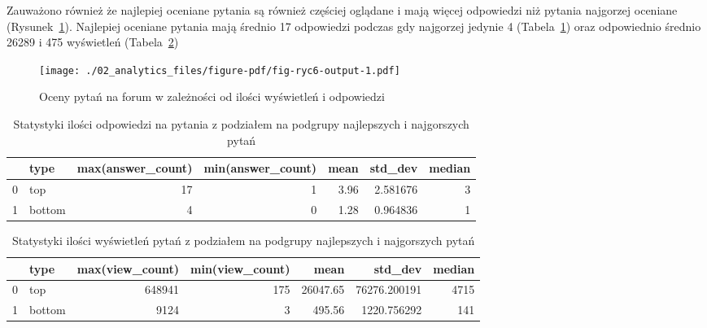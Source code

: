 \documentclass[
  letterpaper,
  DIV=11,
  numbers=noendperiod]{scrreprt}
\begin{document}
Zauważono również że najlepiej oceniane pytania są również częściej
oglądane i mają więcej odpowiedzi niż pytania najgorzej oceniane
(Rysunek~\ref{fig-ryc6}). Najlepiej oceniane pytania mają średnio 17
odpowiedzi podczas gdy najgorzej jedynie 4
(Tabela~\ref{tbl-answers_stats_types}) oraz odpowiednio średnio 26289 i
475 wyświetleń (Tabela~\ref{tbl-views_stats_types})

\begin{figure}

{\centering \texttt{[image: ./02\_analytics\_files/figure-pdf/fig-ryc6-output-1.pdf]}

}

\caption{\label{fig-ryc6}Oceny pytań na forum w zależności od ilości
wyświetleń i odpowiedzi}

\end{figure}

\hypertarget{tbl-answers_stats_types}{}
\begin{table}
\caption{\label{tbl-answers_stats_types}Statystyki ilości odpowiedzi na pytania z podziałem na podgrupy
najlepszych i najgorszych pytań }\tabularnewline

\centering
\begin{tabular}{llrrrrr}
\toprule
{} &    type &  max(answer\_count) &  min(answer\_count) &  mean &   std\_dev &  median \\
\midrule
0 &     top &                 17 &                  1 &  3.96 &  2.581676 &       3 \\
1 &  bottom &                  4 &                  0 &  1.28 &  0.964836 &       1 \\
\bottomrule
\end{tabular}
\end{table}

\hypertarget{tbl-views_stats_types}{}
\begin{table}
\caption{\label{tbl-views_stats_types}Statystyki ilości wyświetleń pytań z podziałem na podgrupy najlepszych i
najgorszych pytań }\tabularnewline

\centering
\begin{tabular}{llrrrrr}
\toprule
{} &    type &  max(view\_count) &  min(view\_count) &      mean &       std\_dev &  median \\
\midrule
0 &     top &           648941 &              175 &  26047.65 &  76276.200191 &    4715 \\
1 &  bottom &             9124 &                3 &    495.56 &   1220.756292 &     141 \\
\bottomrule
\end{tabular}
\end{table}
\end{document}
